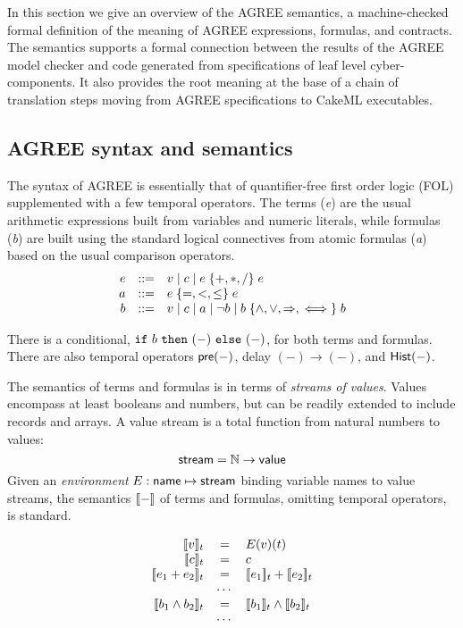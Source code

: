 In this section we give an overview of the AGREE semantics, a
machine-checked formal definition of the meaning of AGREE expressions,
formulas, and contracts. The semantics supports a formal connection
between the results of the AGREE model checker and code generated from
specifications of leaf level cyber-components. It also provides the root
meaning at the base of a chain of translation steps moving from AGREE
specifications to CakeML executables.


\subsection{AGREE syntax and semantics}
\label{agree-semantics}

The syntax of AGREE is essentially that of quantifier-free first order
logic (FOL) supplemented with a few temporal operators. The terms
(\emph{e}) are the usual arithmetic expressions built from variables
and numeric literals, while formulas (\emph{b}) are built using the
standard logical connectives from atomic formulas (\emph{a}) based on
the usual comparison operators.
\[
\begin{array}{rcl}
e & ::= & v \mid c \mid e \;\{ {+,*,/} \}\; e \\
a & ::= & e\; \{ {=,<,\leq} \}\; e \\
b & ::= & v \mid c \mid a \mid \neg b
            \mid b \; \{ {\land,\lor,\Rightarrow,\iff} \}\; b
\end{array}
\]

There is a conditional, $\mbox{$\mathtt{if}\ {b}\ \mathtt{then}\ {(-)}\ \mathtt{else}\ {(-)}$}$, for both terms and
formulas. There are also temporal operators $\mathsf{pre}(-)$, delay
$(-) \to (-)$, and $\mathsf{Hist}(-)$.

The semantics of terms and formulas is in terms of \emph{streams of
values}. Values encompass at least booleans and numbers, but can be
readily extended to include records and arrays. A value stream is a
total function from natural numbers to values:
\[
 \mathsf{stream} = \mathbb{N} \to \mathsf{value}
\]
Given an \emph{environment} $E : \mathsf{name} \mapsto \mathsf{stream}$
binding variable names to value streams, the semantics $[\![ - ]\!]$ of terms and
formulas, omitting temporal operators, is standard.

\[
\begin{array}{rcl}
\sem{v}_t & = & E(v)(t) \\
\sem{c}_t & = & c \\
\sem{e_1 + e_2}_t & = & \sem{e_1}_t + \sem{e_2}_t \\
   & \cdots & \\
\sem{b_1 \land b_2}_t & = & \sem{b_1}_t \land \sem{b_2}_t \\
   & \cdots & \\
\end{array}
\]

